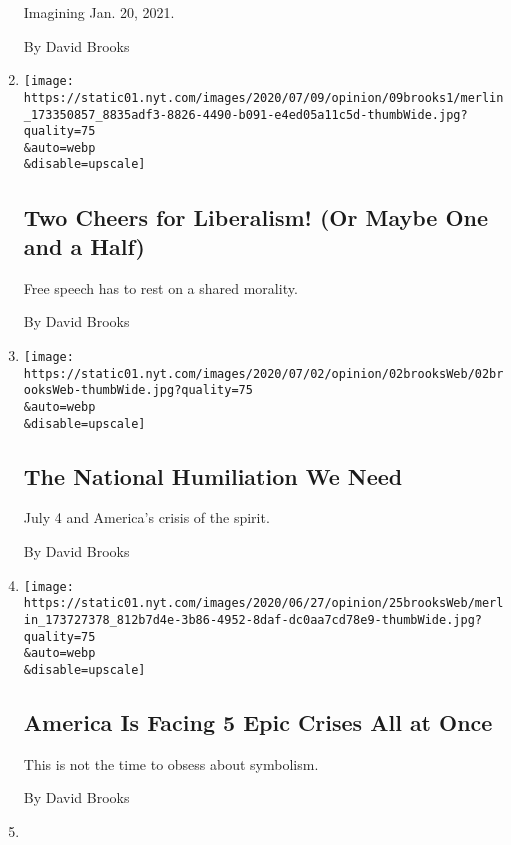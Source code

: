 \begin{enumerate}
  Imagining Jan. 20, 2021.

  By David Brooks
\item
  \href{/2020/07/09/opinion/liberalism-morality.html}{}

  \texttt{[image: https://static01.nyt.com/images/2020/07/09/opinion/09brooks1/merlin\_173350857\_8835adf3-8826-4490-b091-e4ed05a11c5d-thumbWide.jpg?quality=75\\\&auto=webp\\\&disable=upscale]}

  \hypertarget{two-cheers-for-liberalism-or-maybe-one-and-a-half}{%
  \subsection{Two Cheers for Liberalism! (Or Maybe One and a
  Half)}\label{two-cheers-for-liberalism-or-maybe-one-and-a-half}}

  Free speech has to rest on a shared morality.

  By David Brooks
\item
  \href{/2020/07/02/opinion/coronavirus-july-4.html}{}

  \texttt{[image: https://static01.nyt.com/images/2020/07/02/opinion/02brooksWeb/02brooksWeb-thumbWide.jpg?quality=75\\\&auto=webp\\\&disable=upscale]}

  \hypertarget{the-national-humiliation-we-need}{%
  \subsection{The National Humiliation We
  Need}\label{the-national-humiliation-we-need}}

  July 4 and America's crisis of the spirit.

  By David Brooks
\item
  \href{/2020/06/25/opinion/us-coronavirus-protests.html}{}

  \texttt{[image: https://static01.nyt.com/images/2020/06/27/opinion/25brooksWeb/merlin\_173727378\_812b7d4e-3b86-4952-8daf-dc0aa7cd78e9-thumbWide.jpg?quality=75\\\&auto=webp\\\&disable=upscale]}

  \hypertarget{america-is-facing-5-epic-crises-all-at-once}{%
  \subsection{America Is Facing 5 Epic Crises All at
  Once}\label{america-is-facing-5-epic-crises-all-at-once}}

  This is not the time to obsess about symbolism.

  By David Brooks
\item
  \href{/2020/06/18/opinion/black-america-education.html}{}


\end{enumerate}

